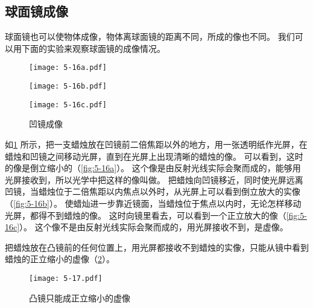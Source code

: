 \subsection{球面镜成像}
球面镜也可以使物体成像，物体离球面镜的距离不同，所成的像也不同。
我们可以用下面的实验来观察球面镜的成像情况。
\begin{figure}
  \begin{minipage}{\linewidth}\centering
    \texttt{[image: 5-16a.pdf]}
    \label{fig:5-16a}
  \end{minipage}
  \begin{minipage}{\linewidth}\centering
    \texttt{[image: 5-16b.pdf]}
    \label{fig:5-16b}
  \end{minipage}
  \begin{minipage}{\linewidth}\centering
    \texttt{[image: 5-16c.pdf]}
    \label{fig:5-16c}
  \end{minipage}
  \caption{凹镜成像}\label{fig:5-16}
\end{figure}

如\cref{fig:5-16} 所示，把一支蜡烛放在凹镜前二倍焦距以外的地方，用一张透明纸作光屏，在蜡烛和凹镜之间移动光屏，直到在光屏上出现清晰的蜡烛的像。
可以看到，这时的像是倒立缩小的（\cref{fig:5-16a}）。
这个像是由反射光线实际会聚而成的，能够用光屏接收到，所以光学中把这样的像叫做。
把蜡烛向凹镜移近，同时使光屏远离凹镜，当蜡烛位于二倍焦距以内焦点以外时，从光屏上可以看到倒立放大的实像（\cref{fig:5-16b}）。
使蜡灿进一步靠近镜面，当蜡烛位于焦点以内时，无论怎样移动光屏，都得不到蜡烛的像。
这时向镜里看去，可以看到一个正立放大的像（\cref{fig:5-16c}）。
这个像不是由反射光线实际会聚而成的，用光屏接收不到，是虚像。

把蜡烛放在凸镜前的任何位置上，用光屏都接收不到蜡烛的实像，只能从镜中看到蜡烛的正立缩小的虚像（\cref{fig:5-17}）。
\begin{figure}
  \texttt{[image: 5-17.pdf]}
  \caption{凸镜只能成正立缩小的虚像}\label{fig:5-17}
\end{figure}

